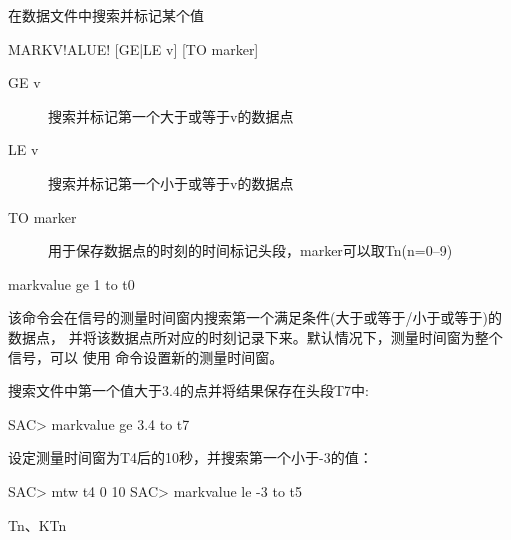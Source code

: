 \label{cmd:markvalue}

在数据文件中搜索并标记某个值

\begin{SACSTX}
MARKV!ALUE! [GE|LE v] [TO marker]
\end{SACSTX}

\begin{description}
\item [GE v] 搜索并标记第一个大于或等于v的数据点
\item [LE v] 搜索并标记第一个小于或等于v的数据点
\item [TO marker] 用于保存数据点的时刻的时间标记头段，marker可以取Tn(n=0--9)
\end{description}

\begin{SACDFT}
markvalue ge 1 to t0
\end{SACDFT}

该命令会在信号的测量时间窗内搜索第一个满足条件(大于或等于/小于或等于)的数据点，
并将该数据点所对应的时刻记录下来。默认情况下，测量时间窗为整个信号，可以
使用  命令设置新的测量时间窗。

搜索文件中第一个值大于3.4的点并将结果保存在头段T7中:
\begin{SACCode}
SAC> markvalue ge 3.4 to t7
\end{SACCode}

设定测量时间窗为T4后的10秒，并搜索第一个小于-3的值：
\begin{SACCode}
SAC> mtw t4 0 10
SAC> markvalue le -3 to t5
\end{SACCode}

Tn、KTn
